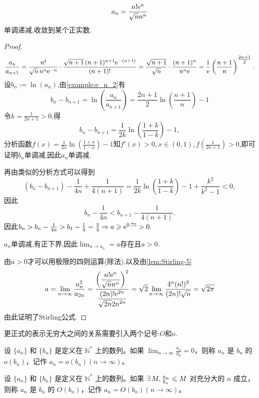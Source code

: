 \begin{lemma}
    $$a_n = \frac{n! \mathrm{e}^n}{\sqrt n n^n}$$单调递减,收敛到某个正实数.
\end{lemma}

\begin{proof}
    \[
        \frac{a_n}{a_{n+1}}
        = \frac{n!}{\sqrt{n}\,n^n \mathrm{e}^{-n}}
        \cdot \frac{\sqrt{n+1}\,(n+1)^{n+1}\mathrm{e}^{-(n+1)}}{(n+1)!}
        = \frac{\sqrt{n+1}}{\sqrt{n}}
        \cdot \frac{(n+1)^n}{n^n \mathrm{e}}
        = \frac{1}{\mathrm{e}}\left(\frac{n+1}{n}\right)^{\tfrac{2n+1}{2}}.
    \]
    设\(b_n := \ln(a_n)\),由\autoref{example:e_n_2}有
    \[
        b_n - b_{n+1}
        = \ln\!\left(\frac{a_n}{a_{n+1}}\right)
        = \frac{2n+1}{2}\ln\!\left(\frac{n+1}{n}\right) - 1
    \]
    令$k=\frac{1}{2n+1} > 0$,得$$b_n -b_{n+1} = \frac{1}{2k} \ln \left( \frac{1+k}{1-k} \right) -1, $$分析函数$f(x) = \frac{1}{2x} \ln \left( \frac{1+x}{1-x} \right) -1$知$f'(x) > 0, x \in (0,1), f\left( \frac{1}{2n+1} \right) > 0$,即可证明$b_n$单调减,因此$a_n$单调减.

    再由类似的分析方式可以得到$$(b_n -b_{n+1}) - \frac{1}{4n} + \frac{1}{4(n+1)} = \frac{1}{2k} \ln \left( \frac{1+k}{1-k} \right) -1 + \frac{k^2}{k^2-1} < 0, $$因此
    $$b_n - \frac{1}{4n} < b_{n+1} - \frac{1}{4(n+1)}.$$
    因此$b_n > b_n - \frac{1}{4n} > b_1 - \frac{1}{4} = \frac{3}{4} \Rightarrow a \geqslant \mathrm{e}^{0.75} > 0.$

    $a_n$单调减,有正下界,因此$\lim_{n \to a_n} = a$存在且$a > 0$.

    由$a > 0$才可以用极限的四则运算(除法),以及由\autoref{lem:Stirling-5}
    \begin{align*}
        a = \lim_{n \to \infty} \frac{a_n^2}{a_{2n}} =
        \frac{\displaystyle  \left(\frac{n! \mathrm{e}^n}{\sqrt n n^n}\right)^2}{\displaystyle  \frac{(2n)! \mathrm{e}^{2n}}{\sqrt{2n} {2n}^{2n}}}
        = \sqrt{2} \lim_{n \to \infty} \frac{4^n (n!)^2}{(2n)! \sqrt{n}} = \sqrt{2 \pi}
    \end{align*}
    由此证明了Stirling公式.
\end{proof}

更正式的表示无穷大之间的关系需要引入两个记号:$O$和$o$.

\begin{definition}
    设 $\{a_n\}$ 和 $\{b_n\}$ 是定义在 $\mathbb{N}^*$ 上的数列。如果 $\lim_{n \to \infty} \frac{a_n}{b_n} = 0$，则称 $a_n$ 是 $b_n$ 的 $o(b_n)$，记作 $a_n = o(b_n) (n \to \infty)$。

    设 $\{a_n\}$ 和 $\{b_n\}$ 是定义在 $\mathbb{N}^*$ 上的数列。如果 $\exists M, \frac{a_n}{b_n} \les M$ 对充分大的 $n$ 成立，则称 $a_n$ 是 $b_n$ 的 $O(b_n)$，记作 $a_n = O(b_n) (n \to \infty)$。
\end{definition}


